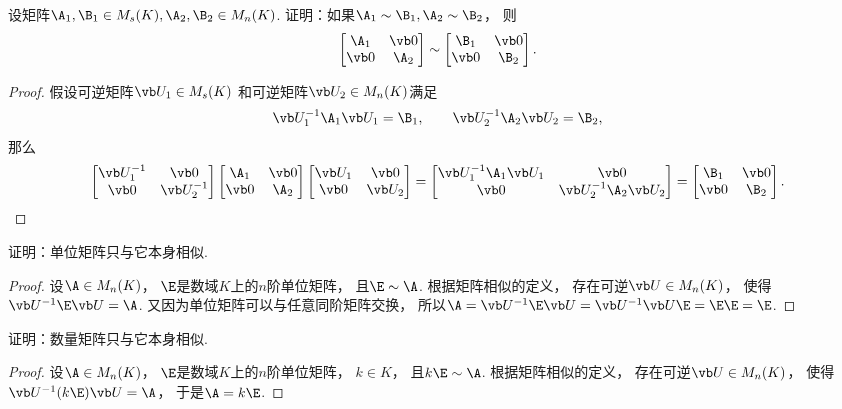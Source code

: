 \begin{example}
设矩阵\(\A_1,\B_1 \in M_s(K),
\A_2,\B_2 \in M_n(K)\).
证明：如果\(\A_1 \sim \B_1,\A_2 \sim \B_2\)，
则\[
	\begin{bmatrix}
		\A_1 & \vb0 \\
		\vb0 & \A_2
	\end{bmatrix}
	\sim \begin{bmatrix}
		\B_1 & \vb0 \\
		\vb0 & \B_2
	\end{bmatrix}.
\]
\begin{proof}
假设可逆矩阵\(\P_1 \in M_s(K)\)
和可逆矩阵\(\P_2 \in M_n(K)\)满足\[
	\P_1^{-1} \A_1 \P_1 = \B_1,
	\qquad
	\P_2^{-1} \A_2 \P_2 = \B_2,
\]
那么\[
	\begin{bmatrix}
		\P_1^{-1} & \vb0 \\
		\vb0 & \P_2^{-1}
	\end{bmatrix}
	\begin{bmatrix}
		\A_1 & \vb0 \\
		\vb0 & \A_2
	\end{bmatrix}
	\begin{bmatrix}
		\P_1 & \vb0 \\
		\vb0 & \P_2
	\end{bmatrix}
	= \begin{bmatrix}
		\P_1^{-1} \A_1 \P_1 & \vb0 \\
		\vb0 & \P_2^{-1} \A_2 \P_2
	\end{bmatrix}
	= \begin{bmatrix}
		\B_1 & \vb0 \\
		\vb0 & \B_2
	\end{bmatrix}.
	\qedhere
\]
\end{proof}
\end{example}
\begin{example}
证明：单位矩阵只与它本身相似.
\begin{proof}
设\(\A \in M_n(K)\)，
\(\E\)是数域\(K\)上的\(n\)阶单位矩阵，
且\(\E \sim \A\).
根据矩阵相似的定义，
存在可逆\(\P \in M_n(K)\)，
使得\(\P^{-1} \E \P = \A\).
又因为单位矩阵可以与任意同阶矩阵交换，
所以\(\A
= \P^{-1} \E \P
= \P^{-1} \P \E
= \E \E
= \E\).
\end{proof}
\end{example}
\begin{example}
证明：数量矩阵只与它本身相似.
\begin{proof}
设\(\A \in M_n(K)\)，
\(\E\)是数域\(K\)上的\(n\)阶单位矩阵，
\(k \in K\)，
且\(k\E \sim \A\).
根据矩阵相似的定义，
存在可逆\(\P \in M_n(K)\)，
使得\(\P^{-1} (k\E) \P = \A\)，
于是\(\A = k\E\).
\end{proof}
\end{example}

